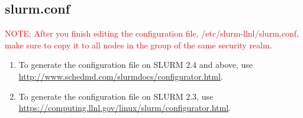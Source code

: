\subsection{slurm.conf}
\label{sec:slurm.conf}

\textcolor{red}{NOTE: After you finish editing the configuration file,
/etc/slurm-llnl/slurm.conf, make sure to copy it to all nodes in the group of
the same security realm}.

\begin{enumerate}
  \item To generate the configuration file on SLURM 2.4 and above, use
\url{http://www.schedmd.com/slurmdocs/configurator.html}. 
  
  \item To generate the configuration file on SLURM 2.3, use
\url{https://computing.llnl.gov/linux/slurm/configurator.html}. 
   
\end{enumerate}

